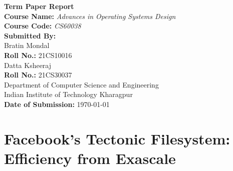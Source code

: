 \documentclass[12pt]{report}
\begin{document}
\sloppy
\begin{titlepage}
    \centering
    \vspace*{1.5in}
    {\Huge\bfseries Term Paper Report\\[1.5em]}
    {\large \textbf{Course Name:} \textit{Advances in Operating Systems Design}}\\[0.5em]
    {\large \textbf{Course Code:} \textit{CS60038}}\\
    \vspace{1in}
    {\large \textbf{Submitted By:}}\\[1em]
    {\large Bratin Mondal\\\textbf{Roll No.:} 21CS10016}\\[1em]
    {\large Datta Ksheeraj\\\textbf{Roll No.:} 21CS30037}\\
    \vspace{1in}
    {\large Department of Computer Science and Engineering}\\[0.5em]
    {\large Indian Institute of Technology Kharagpur}\\
    \vfill
    {\large \textbf{Date of Submission:} \today}
\end{titlepage}

\begin{abstract}
This term paper explores two advanced technologies in the field of data management and storage: Facebook's Tectonic Filesystem and Google's Monarch. The Tectonic Filesystem is engineered for efficiency at exascale, designed to manage vast amounts of data with exceptional performance and reliability. In contrast, Monarch serves as a globally distributed, highly available time-series database, supporting many of Google's critical applications by enabling low-latency queries and efficient storage of telemetry and monitoring data at an unparalleled scale.

For both technologies, we first examine the motivation behind their design, followed by an analysis of their technical and practical aspects. Finally, we provide our evaluation and insights based on a critical assessment of the respective papers.
\end{abstract}

\tableofcontents
\newpage

\chapter{Facebook's Tectonic Filesystem: Efficiency from Exascale}
\end{document}
